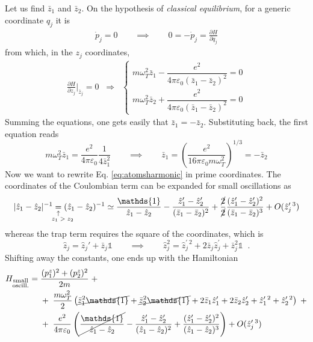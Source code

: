 Let us find $\bar{z}_1$ and $\bar{z}_2$.
On the hypothesis of \textit{classical equilibrium}, for a generic coordinate $q_j$ it is
\begin{align*}
\dot{p}_j = 0\qquad \implies \qquad
0 = -\dot{p}_j = \frac{\partial H}{\partial q_j}
\end{align*}
from which, in the $z_j$ coordinates,
\begin{align}
\label{eq:atomsmoments}
\frac{\partial H}{\partial z_j} \bigg\rvert_{\bar{z}_j} = 0
\;\;\Rightarrow\;\;
\begin{cases}
    m\omega_T^2\bar{z}_1 -\dfrac{e^2}{4\pi\varepsilon_0(\bar{z}_1-\bar{z}_2)^2} = 0\\
    m\omega_T^2\bar{z}_2 + \dfrac{e^2}{4\pi\varepsilon_0(\bar{z}_1-\bar{z}_2)^2} = 0
\end{cases}
\end{align}
Summing the equations, one gets easily that $\bar{z}_1=-\bar{z}_2$. Substituting back, the first equation reads
\begin{equation}
\label{eq:atomssymmetrycond}
m\omega_T^2\bar{z}_1 = \frac{e^2}{4\pi\varepsilon_0}\frac{1}{4\bar{z}_1^2}
\qquad \implies \qquad
\bar{z}_1 = 
\left( \frac{e^2}{16\pi\varepsilon_0m\omega_T^2} \right)^{1/3} = -\bar{z}_2
\end{equation}
Now we want to rewrite Eq. \ref{eq:atomsharmonic} in prime coordinates. The coordinates of the Coulombian term can be expanded for small oscillations as
\begin{equation*}
|\hat{z}_1-\hat{z}_2|^{-1} \equalexpl{$z_1>z_2$}
(\hat{z}_1-\hat{z}_2)^{-1} \simeq
\frac{\mathds{1}}{\hat{z}_1-\hat{z}_2}
-\frac{\hat{z}_1'-\hat{z}_2'}{(\bar{z}_1-\bar{z}_2)^2}
+\frac{\cancel{2}}{\cancel{2}}\frac{(\hat{z}_1'-\hat{z}_2')^2}{(\bar{z}_1-\bar{z}_2)^3}
+{O}(\hat{z}_j^{\prime\;3})
\end{equation*}
whereas the trap term requires the square of the coordinates, which is
\begin{equation*}
\hat{z}_j = \hat{z}_j' + \bar{z}_j\mathds{1}
\qquad\implies\qquad
\hat{z}_j^2 = \hat{z}_j^{\prime\;2} +
2\bar{z}_j\hat{z}_j^\prime +
\bar{z}_j^2\mathds{1} \;\;.
\end{equation*}
Shifting away the constants, one ends up with the Hamiltonian 
\begin{align}
\begin{split}
H_{\substack{\text{small} \\ \text{oscill.}}} = \; &
\frac{(p_1^z)^2+(p_2^z)^2}{2m}
\;+ \\
& +\; \frac{m\omega_T^2}{2}
    \left(
        \cancel{\bar{z}_1^2\mathds{1}} + \cancel{\bar{z}_2^2\mathds{1}}
        + 2 \bar{z}_1\hat{z}_1' + 2 \bar{z}_2\hat{z}_2'
        + \hat{z}_1^{\prime\;2} + \hat{z}_2^{\prime\;2}
    \right) \;+ \\
& +\;
\frac{e^2}{4\pi \varepsilon_0}
\left(
    \cancel{\frac{\mathds{1}}{ \hat{z}_1-\hat{z}_2 }}       - \frac{\hat{z}_1'-\hat{z}_2'}{(\hat{z}_1-\hat{z}_2)^2}
        + \frac{(\hat{z}_1'-\hat{z}_2')^2}{(\hat{z}_1-\hat{z}_2)^3}
\right)
+{O}(\hat{z}_j^{\prime\;3})
\end{split}
\end{align}
